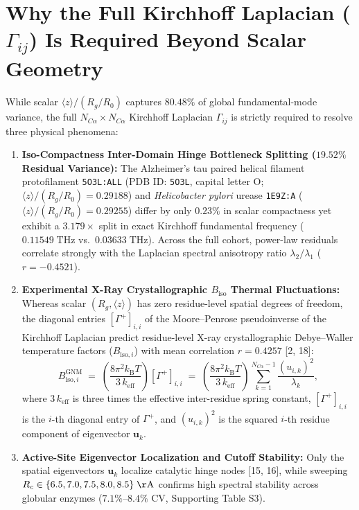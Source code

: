 \documentclass[11pt,onecolumn,letterpaper]{article}
\begin{document}
\section{Why the Full Kirchhoff Laplacian ($\Gamma_{ij}$) Is Required Beyond Scalar Geometry}
While scalar $\langle z \rangle / (R_g / R_0)$ captures $80.48\%$ of global fundamental-mode variance, the full $N_{C\alpha} \times N_{C\alpha}$ Kirchhoff Laplacian $\Gamma_{ij}$ is strictly required to resolve three physical phenomena:
\begin{enumerate}
    \item \textbf{Iso-Compactness Inter-Domain Hinge Bottleneck Splitting ($19.52\%$ Residual Variance):} The Alzheimer's tau paired helical filament protofilament \texttt{5O3L:ALL} (PDB ID: \texttt{5O3L}, capital letter O; $\langle z \rangle / (R_g / R_0) = 0.29188$) and \textit{Helicobacter pylori} urease \texttt{1E9Z:A} ($\langle z \rangle / (R_g / R_0) = 0.29255$) differ by only $0.23\%$ in scalar compactness yet exhibit a $3.179\times$ split in exact Kirchhoff fundamental frequency ($0.11549\;\mathrm{THz}$ vs.\ $0.03633\;\mathrm{THz}$). Across the full cohort, power-law residuals correlate strongly with the Laplacian spectral anisotropy ratio $\lambda_2 / \lambda_1$ ($r = -0.4521$).
    \item \textbf{Experimental X-Ray Crystallographic $B_{\mathrm{iso}}$ Thermal Fluctuations:} Whereas scalar $(R_g, \langle z \rangle)$ has zero residue-level spatial degrees of freedom, the diagonal entries $\left[\Gamma^{+}\right]_{i,i}$ of the Moore--Penrose pseudoinverse of the Kirchhoff Laplacian predict residue-level X-ray crystallographic Debye--Waller temperature factors ($B_{\mathrm{iso},i}$) with mean correlation $r = 0.4257$ [2, 18]:
    \begin{equation}
    B_{\mathrm{iso},i}^{\mathrm{GNM}} \;=\; \left(\frac{8\pi^2 k_{\mathrm{B}} T}{3\,k_{\mathrm{eff}}}\right) \left[\Gamma^{+}\right]_{i,i} \;=\; \left(\frac{8\pi^2 k_{\mathrm{B}} T}{3\,k_{\mathrm{eff}}}\right) \sum_{k=1}^{N_{C\alpha}-1} \frac{\left(u_{i,k}\right)^2}{\lambda_k},
    \end{equation}
    where $3\,k_{\mathrm{eff}}$ is three times the effective inter-residue spring constant, $\left[\Gamma^{+}\right]_{i,i}$ is the $i$-th diagonal entry of $\Gamma^{+}$, and $\left(u_{i,k}\right)^2$ is the squared $i$-th residue component of eigenvector $\mathbf{u}_k$.
    \item \textbf{Active-Site Eigenvector Localization and Cutoff Stability:} Only the spatial eigenvectors $\mathbf{u}_k$ localize catalytic hinge nodes [15, 16], while sweeping $R_c \in \{6.5, 7.0, 7.5, 8.0, 8.5\}\;\mathrm{\AA}$ confirms high spectral stability across globular enzymes ($7.1\%$--$8.4\%$ CV, Supporting Table S3).
\end{enumerate}
\end{document}
